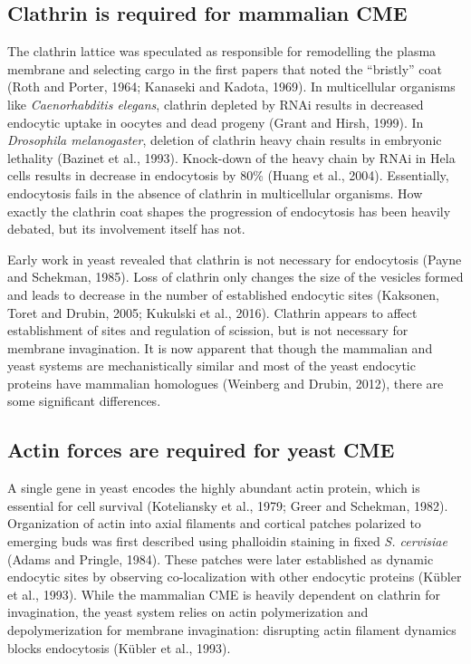 		\subsection{Clathrin is required for mammalian CME}
The clathrin lattice was speculated as responsible for remodelling the plasma membrane and selecting cargo in the first papers that noted the “bristly” coat (Roth and Porter, 1964; Kanaseki and Kadota, 1969).  In multicellular organisms like \textit{Caenorhabditis elegans}, clathrin depleted by RNAi results in decreased endocytic uptake in oocytes and dead progeny (Grant and Hirsh, 1999). In \textit{Drosophila melanogaster}, deletion of clathrin heavy chain results in embryonic lethality (Bazinet et al., 1993). Knock-down of the heavy chain by RNAi in Hela cells results in decrease in endocytosis by 80\% (Huang et al., 2004). Essentially, endocytosis fails in the absence of clathrin in multicellular organisms. How exactly the clathrin coat shapes the progression of endocytosis has been heavily debated, but its involvement itself has not. 

\vspace{5mm}
Early work in yeast revealed that clathrin is not necessary for endocytosis (Payne and Schekman, 1985). Loss of clathrin only changes the size of the vesicles formed and leads to decrease in the number of established endocytic sites (Kaksonen, Toret and Drubin, 2005; Kukulski et al., 2016). Clathrin appears to affect establishment of sites and regulation of scission, but is not necessary for membrane invagination. It is now apparent that though the mammalian and yeast systems are mechanistically similar and most of the yeast endocytic proteins have mammalian homologues (Weinberg and Drubin, 2012), there are some significant differences.


		\subsection{Actin forces are required for yeast CME}
A single gene in yeast encodes the highly abundant actin protein, which is essential for cell survival (Koteliansky et al., 1979; Greer and Schekman, 1982). Organization of actin into axial filaments and cortical patches polarized to emerging buds was first described using phalloidin staining in fixed \textit{S. cervisiae} (Adams and Pringle, 1984). These patches were later established as dynamic endocytic sites by observing co-localization with other endocytic proteins (Kübler et al., 1993). While the mammalian CME is heavily dependent on clathrin for invagination, the yeast system relies on actin polymerization and depolymerization for membrane invagination: disrupting actin filament dynamics blocks endocytosis (Kübler et al., 1993). 



